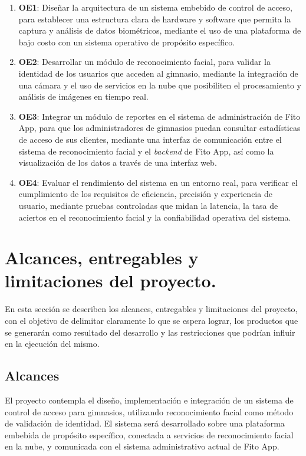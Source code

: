 \begin{enumerate}
    \item \textbf{OE1}: Diseñar la arquitectura de un sistema embebido de control de acceso, para establecer una estructura clara de hardware y software que permita la captura y análisis de datos biométricos, mediante el uso de una plataforma de bajo costo con un sistema operativo de propósito específico.

    \item \textbf{OE2}: Desarrollar un módulo de reconocimiento facial, para validar la identidad de los usuarios que acceden al gimnasio, mediante la integración de una cámara y el uso de servicios en la nube que posibiliten el procesamiento y análisis de imágenes en tiempo real.
    
    \item \textbf{OE3}: Integrar un módulo de reportes en el sistema de administración de Fito App, para que los administradores de gimnasios puedan consultar estadísticas de acceso de sus clientes, mediante una interfaz de comunicación entre el sistema de reconocimiento facial y el \textit{backend} de Fito App, así como la visualización de los datos a través de una interfaz web.
    
    \item \textbf{OE4}: Evaluar el rendimiento del sistema en un entorno real, para verificar el cumplimiento de los requisitos de eficiencia, precisión y experiencia de usuario, mediante pruebas controladas que midan la latencia, la tasa de aciertos en el reconocimiento facial y la confiabilidad operativa del sistema.

\end{enumerate}

\section{Alcances, entregables y limitaciones del proyecto.}
En esta sección se describen los alcances, entregables y limitaciones del proyecto, con el objetivo de delimitar claramente lo que se espera lograr, los productos que se generarán como resultado del desarrollo y las restricciones que podrían influir en la ejecución del mismo.

\subsection{Alcances}
El proyecto contempla el diseño, implementación e integración de un sistema de control de acceso para gimnasios, utilizando reconocimiento facial como método de validación de identidad. El sistema será desarrollado sobre una plataforma embebida de propósito específico, conectada a servicios de reconocimiento facial en la nube, y comunicada con el sistema administrativo actual de Fito App.

